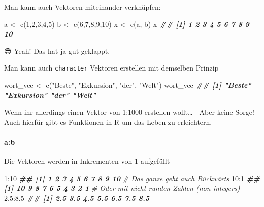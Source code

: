 \documentclass[
]{article}
\newenvironment{Shaded}{\begin{snugshade}}{\end{snugshade}}
\newcommand{\CommentTok}[1]{\textcolor[rgb]{0.56,0.35,0.01}{\textit{#1}}}
\newcommand{\DecValTok}[1]{\textcolor[rgb]{0.00,0.00,0.81}{#1}}
\newcommand{\DocumentationTok}[1]{\textcolor[rgb]{0.56,0.35,0.01}{\textbf{\textit{#1}}}}
\newcommand{\FloatTok}[1]{\textcolor[rgb]{0.00,0.00,0.81}{#1}}
\newcommand{\FunctionTok}[1]{\textcolor[rgb]{0.00,0.00,0.00}{#1}}
\newcommand{\NormalTok}[1]{#1}
\newcommand{\OtherTok}[1]{\textcolor[rgb]{0.56,0.35,0.01}{#1}}
\newcommand{\SpecialCharTok}[1]{\textcolor[rgb]{0.00,0.00,0.00}{#1}}
\newcommand{\StringTok}[1]{\textcolor[rgb]{0.31,0.60,0.02}{#1}}
\begin{document}
Man kann auch Vektoren miteinander verknüpfen:

\begin{Shaded}
\begin{Highlighting}[]
\NormalTok{a }\OtherTok{\textless{}{-}} \FunctionTok{c}\NormalTok{(}\DecValTok{1}\NormalTok{,}\DecValTok{2}\NormalTok{,}\DecValTok{3}\NormalTok{,}\DecValTok{4}\NormalTok{,}\DecValTok{5}\NormalTok{)}
\NormalTok{b }\OtherTok{\textless{}{-}} \FunctionTok{c}\NormalTok{(}\DecValTok{6}\NormalTok{,}\DecValTok{7}\NormalTok{,}\DecValTok{8}\NormalTok{,}\DecValTok{9}\NormalTok{,}\DecValTok{10}\NormalTok{)}
\NormalTok{x }\OtherTok{\textless{}{-}} \FunctionTok{c}\NormalTok{(a, b)}
\NormalTok{x}
\DocumentationTok{\#\#  [1]  1  2  3  4  5  6  7  8  9 10}
\end{Highlighting}
\end{Shaded}

😎 Yeah! Das hat ja gut geklappt.

Man kann auch \texttt{character} Vektoren erstellen mit demselben Prinzip

\begin{Shaded}
\begin{Highlighting}[]
\NormalTok{wort\_vec }\OtherTok{\textless{}{-}} \FunctionTok{c}\NormalTok{(}\StringTok{"Beste"}\NormalTok{, }\StringTok{"Exkursion"}\NormalTok{, }\StringTok{"der"}\NormalTok{, }\StringTok{"Welt"}\NormalTok{)}
\NormalTok{wort\_vec}
\DocumentationTok{\#\# [1] "Beste"     "Exkursion" "der"       "Welt"}
\end{Highlighting}
\end{Shaded}

Wenn ihr allerdings einen Vektor von 1:1000 erstellen wollt\ldots{} 🤯
Aber keine Sorge! Auch hierfür gibt es Funktionen in R um das Leben zu erleichtern.

\hypertarget{ab}{%
\paragraph{a:b}\label{ab}}

Die Vektoren werden in Inkrementen von 1 aufgefüllt

\begin{Shaded}
\begin{Highlighting}[]
\DecValTok{1}\SpecialCharTok{:}\DecValTok{10}
\DocumentationTok{\#\#  [1]  1  2  3  4  5  6  7  8  9 10}
\CommentTok{\# Das ganze geht auch Rückwärts}
\DecValTok{10}\SpecialCharTok{:}\DecValTok{1}
\DocumentationTok{\#\#  [1] 10  9  8  7  6  5  4  3  2  1}
\CommentTok{\# Oder mit nicht runden Zahlen (non{-}integers)}
\FloatTok{2.5}\SpecialCharTok{:}\FloatTok{8.5}
\DocumentationTok{\#\# [1] 2.5 3.5 4.5 5.5 6.5 7.5 8.5}
\end{Highlighting}
\end{Shaded}
\end{document}
